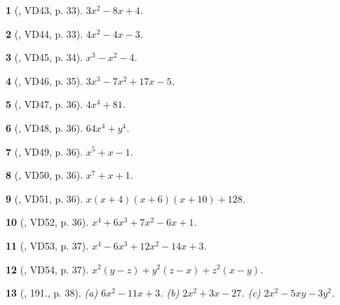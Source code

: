 \documentclass{article}
\newtheorem{baitoan}{}
\begin{document}
\begin{baitoan}[\cite{Binh_Toan_8_tap_1}, VD43, p. 33]
	$3x^2 - 8x + 4$.
\end{baitoan}

\begin{baitoan}[\cite{Binh_Toan_8_tap_1}, VD44, p. 33]
	$4x^2 - 4x - 3$.
\end{baitoan}

\begin{baitoan}[\cite{Binh_Toan_8_tap_1}, VD45, p. 34]
	$x^3 - x^2 - 4$.
\end{baitoan}

\begin{baitoan}[\cite{Binh_Toan_8_tap_1}, VD46, p. 35]
	$3x^3 - 7x^2 + 17x - 5$.
\end{baitoan}

\begin{baitoan}[\cite{Binh_Toan_8_tap_1}, VD47, p. 36]
	$4x^4 + 81$.
\end{baitoan}

\begin{baitoan}[\cite{Binh_Toan_8_tap_1}, VD48, p. 36]
	$64x^4 + y^4$.
\end{baitoan}

\begin{baitoan}[\cite{Binh_Toan_8_tap_1}, VD49, p. 36]
	$x^5 + x - 1$.
\end{baitoan}

\begin{baitoan}[\cite{Binh_Toan_8_tap_1}, VD50, p. 36]
	$x^7 + x + 1$.
\end{baitoan}

\begin{baitoan}[\cite{Binh_Toan_8_tap_1}, VD51, p. 36]
	$x(x + 4)(x + 6)(x + 10) + 128$.
\end{baitoan}

\begin{baitoan}[\cite{Binh_Toan_8_tap_1}, VD52, p. 36]
	$x^4 + 6x^3 + 7x^2 - 6x + 1$.
\end{baitoan}

\begin{baitoan}[\cite{Binh_Toan_8_tap_1}, VD53, p. 37]
	$x^4 - 6x^3 + 12x^2 - 14x + 3$.
\end{baitoan}

\begin{baitoan}[\cite{Binh_Toan_8_tap_1}, VD54, p. 37]
	$x^2(y - z) + y^2(z - x) + z^2(x - y)$.
\end{baitoan}

\begin{baitoan}[\cite{Binh_Toan_8_tap_1}, 191., p. 38]
	(a) $6x^2 - 11x + 3$. (b) $2x^2 + 3x - 27$. (c) $2x^2 - 5xy - 3y^2$.
\end{baitoan}
\end{document}
